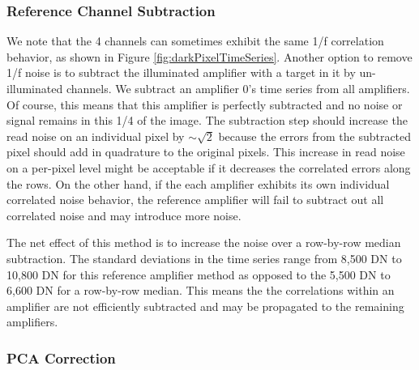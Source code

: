 \documentclass[]{aastex62}
\begin{document}
\subsubsection{Reference Channel Subtraction}
We note that the 4 channels can sometimes exhibit the same 1/f correlation behavior, as shown in Figure \ref{fig:darkPixelTimeSeries}.
Another option to remove 1/f noise is to subtract the illuminated amplifier with a target in it by un-illuminated channels.
We subtract an amplifier 0's time series from all amplifiers.
Of course, this means that this amplifier is perfectly subtracted and no noise or signal remains in this 1/4 of the image.
The subtraction step should increase the read noise on an individual pixel by $\sim \sqrt{2}$ because the errors from the subtracted pixel should add in quadrature to the original pixels.
This increase in read noise on a per-pixel level might be acceptable if it decreases the correlated errors along the rows.
On the other hand, if the each amplifier exhibits its own individual correlated noise behavior, the reference amplifier will fail to subtract out all correlated noise and may introduce more noise.

The net effect of this method is to increase the noise over a row-by-row median subtraction.
The standard deviations in the time series range from 8,500 DN to 10,800 DN for this reference amplifier method as opposed to the 5,500 DN to 6,600 DN for a row-by-row median.
This means the the correlations within an amplifier are not efficiently subtracted and may be propagated to the remaining amplifiers.


\subsubsection{PCA Correction}
\end{document}
